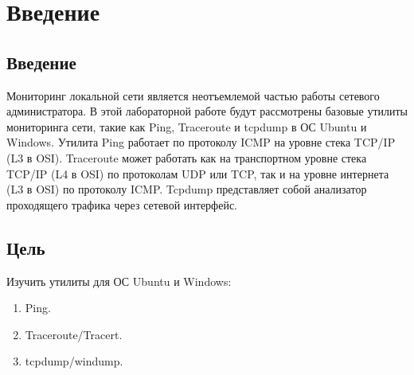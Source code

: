 \chapter{Введение}
\label{ch:intro}

\section{Введение}

Мониторинг локальной сети является неотъемлемой частью работы сетевого
администратора. В этой лабораторной работе будут рассмотрены базовые утилиты
мониторинга сети, такие как Ping, Traceroute и tcpdump в ОС Ubuntu и Windows. Утилита Ping
работает по протоколу ICMP на уровне стека TCP/IP (L3 в OSI). Traceroute может работать как
на транспортном уровне стека TCP/IP (L4 в OSI) по протоколам UDP или TCP, так и на уровне
интернета (L3 в OSI) по протоколу ICMP. Tcpdump представляет собой анализатор проходящего
трафика через сетевой интерфейс.


\section{Цель}  

Изучить утилиты для ОС Ubuntu и Windows:
\begin{enumerate}
    \item Ping.
    \item Traceroute/Tracert.
    \item tcpdump/windump.
\end{enumerate}

\endinput